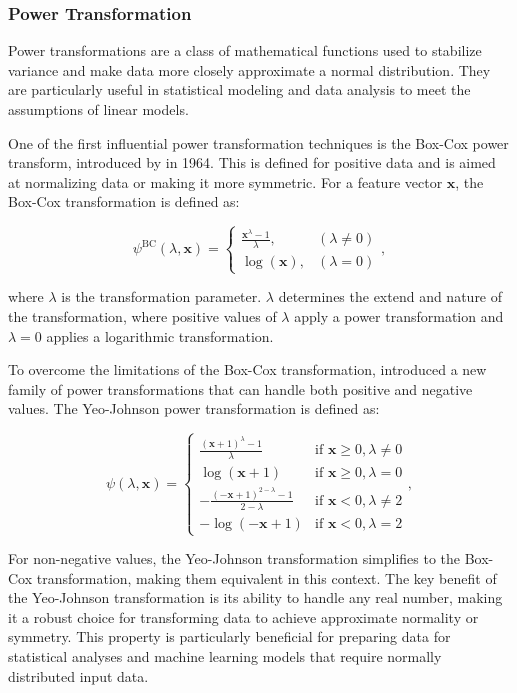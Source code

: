 \subsubsection{Power Transformation}
Power transformations are a class of mathematical functions used to stabilize variance and make data more closely approximate a normal distribution.
They are particularly useful in statistical modeling and data analysis to meet the assumptions of linear models.

One of the first influential power transformation techniques is the Box-Cox power transform, introduced by \citet{BoxAndCox} in 1964.
This is defined for positive data and is aimed at normalizing data or making it more symmetric.
For a feature vector $\mathbf{x}$, the Box-Cox transformation is defined as:

$$
\psi^{\text{BC}}(\lambda, \mathbf{x}) =
\begin{cases}
\frac{\mathbf{x}^\lambda - 1}{\lambda}, & (\lambda \neq 0) \\
\log(\mathbf{x}), & (\lambda = 0)
\end{cases},
$$

where $\lambda$ is the transformation parameter.
$\lambda$ determines the extend and nature of the transformation, where positive values of $\lambda$ apply a power transformation and $\lambda = 0$ applies a logarithmic transformation.

To overcome the limitations of the Box-Cox transformation, \citet{YeoJohnson} introduced a new family of power transformations that can handle both positive and negative values.
The Yeo-Johnson power transformation is defined as:

$$
\psi(\lambda, \mathbf{x}) =
\begin{cases}
\frac{(\mathbf{x} + 1)^\lambda - 1}{\lambda} & \text{if } \mathbf{x} \geq 0, \lambda \neq 0 \\
\log(\mathbf{x} + 1) & \text{if } \mathbf{x} \geq 0, \lambda = 0 \\
-\frac{(-\mathbf{x} + 1)^{2 - \lambda} - 1}{2 - \lambda} & \text{if } \mathbf{x} < 0, \lambda \neq 2 \\
-\log(-\mathbf{x} + 1) & \text{if } \mathbf{x} < 0, \lambda = 2
\end{cases},
$$

For non-negative values, the Yeo-Johnson transformation simplifies to the Box-Cox transformation, making them equivalent in this context.
The key benefit of the Yeo-Johnson transformation is its ability to handle any real number, making it a robust choice for transforming data to achieve approximate normality or symmetry.
This property is particularly beneficial for preparing data for statistical analyses and machine learning models that require normally distributed input data.